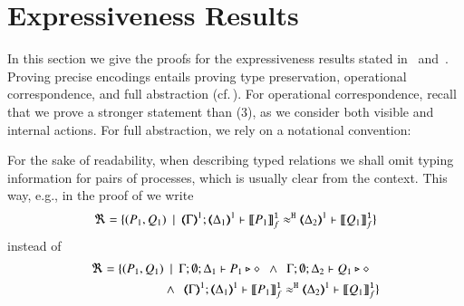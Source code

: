 \section{Expressiveness Results}
\label{app:proofs}

\noi
In this section we give the proofs for the expressiveness
results stated in~ and~.
Proving precise encodings entails proving type preservation, operational correspondence, and 
full abstraction (cf.\,). For operational correspondence, 
recall that we prove a stronger statement than (3),
		as we %
		consider both visible and internal actions.
For full abstraction, we rely on a notational convention:

\begin{notation}
For the sake of readability, when describing typed relations we shall omit typing information for pairs of processes, which is usually clear from the context. This way, e.g., in the proof of
  we write
	\[
		\Re = \set{(P_1, Q_1) \setbar \horel{\mapt{\Gamma}^{1}}{\mapt{\Delta_1}^{1}}{\pmapp{P_1}{1}{f}}{\hwb}{\mapt{\Delta_2}^{1}}{\pmapp{Q_1}{1}{f}}}
	\]
	instead of 
		\begin{align*}
		\Re = \set{(P_1, Q_1) & \setbar 
		\Gamma; \emptyset; \Delta_1 \proves P_1 \hastype \Proc
		~~\land~~ 
		\Gamma; \emptyset; \Delta_2 \proves Q_1 \hastype \Proc
		 \\ & \land~~
		\horel{\mapt{\Gamma}^{1}}{\mapt{\Delta_1}^{1}}{\pmapp{P_1}{1}{f}}{\hwb}{\mapt{\Delta_2}^{1}}{\pmapp{Q_1}{1}{f}}}
	\end{align*}
	\end{notation}


